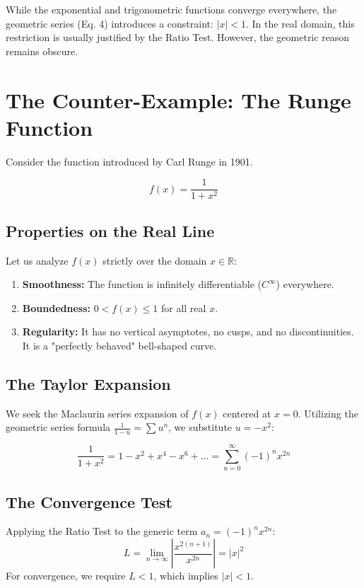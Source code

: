 \documentclass[11pt, letterpaper]{article}
\theoremstyle{definition}
\theoremstyle{remark}
\newcommand{\R}{\mathbb{R}}
\begin{document}
While the exponential and trigonometric functions converge everywhere, the geometric series (Eq. 4) introduces a constraint: $|x| < 1$. In the real domain, this restriction is usually justified by the Ratio Test. However, the geometric reason remains obscure.

\section{The Counter-Example: The Runge Function}

Consider the function introduced by Carl Runge in 1901.

\begin{equation}
    f(x) = \frac{1}{1+x^2}
\end{equation}

\subsection{Properties on the Real Line}
Let us analyze $f(x)$ strictly over the domain $x \in \R$:
\begin{enumerate}
    \item \textbf{Smoothness:} The function is infinitely differentiable ($C^\infty$) everywhere.
    \item \textbf{Boundedness:} $0 < f(x) \le 1$ for all real $x$.
    \item \textbf{Regularity:} It has no vertical asymptotes, no cusps, and no discontinuities. It is a "perfectly behaved" bell-shaped curve.
\end{enumerate}

\subsection{The Taylor Expansion}
We seek the Maclaurin series expansion of $f(x)$ centered at $x=0$. Utilizing the geometric series formula $\frac{1}{1-u} = \sum u^n$, we substitute $u = -x^2$:

\begin{equation}
    \frac{1}{1+x^2} = 1 - x^2 + x^4 - x^6 + \dots = \sum_{n=0}^{\infty} (-1)^n x^{2n}
\end{equation}

\subsection{The Convergence Test}
Applying the Ratio Test to the generic term $a_n = (-1)^n x^{2n}$:
\begin{equation}
    L = \lim_{n \to \infty} \left| \frac{x^{2(n+1)}}{x^{2n}} \right| = |x|^2
\end{equation}
For convergence, we require $L < 1$, which implies $|x| < 1$.
\end{document}
